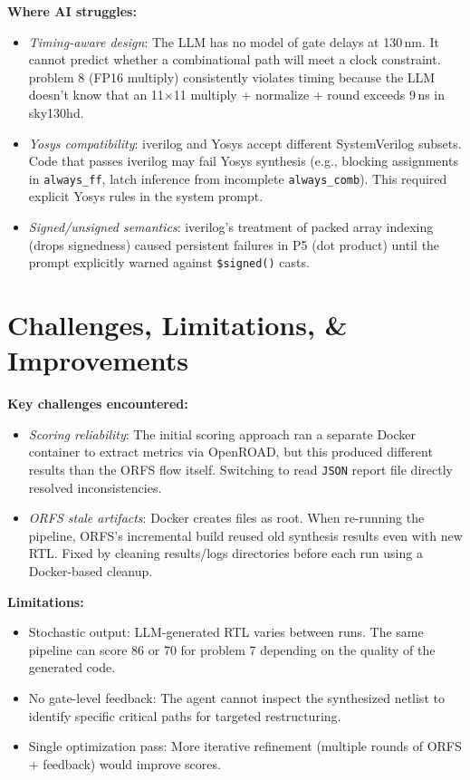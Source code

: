 \documentclass[10pt]{article}
\begin{document}
\textbf{Where AI struggles:}
\begin{itemize}[topsep=2pt,itemsep=0pt]
  \item \emph{Timing-aware design}: The LLM has no model of gate delays at 130\,nm. 
    It cannot predict whether a combinational path will meet a clock constraint. 
    problem 8 (FP16 multiply) consistently violates timing because the LLM doesn't know that an 
    11$\times$11 multiply + normalize + round exceeds 9\,ns in sky130hd.
  \item \emph{Yosys compatibility}: iverilog and Yosys accept different SystemVerilog subsets. 
    Code that passes iverilog may fail Yosys synthesis (e.g., blocking assignments in \texttt{always\_ff}, 
    latch inference from incomplete \texttt{always\_comb}). This required explicit Yosys rules in the system prompt.
  \item \emph{Signed/unsigned semantics}: iverilog's treatment of packed array indexing (drops signedness) 
    caused persistent failures in P5 (dot product) until the prompt explicitly warned against \texttt{\$signed()} casts.
\end{itemize}

\section{Challenges, Limitations, \& Improvements}

\textbf{Key challenges encountered:}
\begin{itemize}[topsep=2pt,itemsep=0pt]
  \item \emph{Scoring reliability}: The initial scoring approach ran a separate Docker container 
    to extract metrics via OpenROAD, but this produced different results than the ORFS flow itself. 
    Switching to read \texttt{JSON} report file directly resolved inconsistencies.
  \item \emph{ORFS stale artifacts}: Docker creates files as root. When re-running the pipeline, 
    ORFS's incremental build reused old synthesis results even with new RTL. 
    Fixed by cleaning results/logs directories before each run using a Docker-based cleanup.
\end{itemize}

\textbf{Limitations:}
\begin{itemize}[topsep=2pt,itemsep=0pt]
  \item Stochastic output: LLM-generated RTL varies between runs. 
    The same pipeline can score 86 or 70 for problem 7 
    depending on the quality of the generated code.
  \item No gate-level feedback: The agent cannot inspect the synthesized netlist 
    to identify specific critical paths for targeted restructuring.
  \item Single optimization pass: More iterative refinement (multiple rounds of ORFS + feedback) would improve scores.
\end{itemize}
\end{document}
